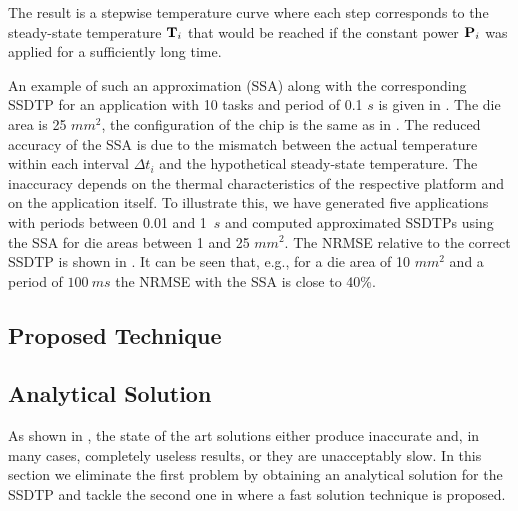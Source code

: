 The result is a stepwise temperature curve where each step corresponds to the
steady-state temperature $\mathbf{T}_i$ that would be reached if the constant power
$\mathbf{P}_i$ was applied for a sufficiently long time.

An example of such an approximation (SSA) along with the corresponding SSDTP for
an application with 10 tasks and period of 0.1 $s$ is given in
. The die area is 25 $mm^2$, the configuration
of the chip is the same as in . The reduced accuracy of the SSA
is due to the mismatch between the actual temperature within each interval
$\Delta t_i$ and the hypothetical steady-state temperature. The inaccuracy
depends on the thermal characteristics of the respective platform and on the
application itself. To illustrate this, we have generated five applications with
periods between 0.01 and 1~$s$ and computed approximated SSDTPs using the SSA
for die areas between 1 and 25 $mm^2$. The NRMSE relative to the correct SSDTP
is shown in . It can be seen that, e.g., for a die area
of 10 $mm^2$ and a period of $100~ms$ the NRMSE with the SSA is close to 40\%.

\subsection{Proposed Technique}

\subsection{Analytical Solution}

As shown in , the state of the art solutions either
produce inaccurate and, in many cases, completely useless results, or they are
unacceptably slow. In this section we eliminate the first problem by obtaining
an analytical solution for the SSDTP and tackle the second one in
 where a fast solution technique is proposed.

